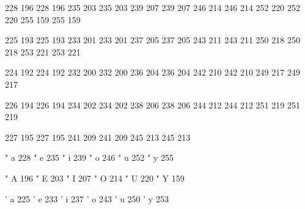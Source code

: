 

\startmapping[texnansi] 

 228 196  228 196  
 235 203  235 203
 239 207  239 207
 246 214  246 214
 252 220  252 220
 255 159  255 159

 225 193  225 193
 233 201  233 201
 237 205  237 205
 243 211  243 211
 250 218  250 218
 253 221  253 221

 224 192  224 192
 232 200  232 200
 236 204  236 204
 242 210  242 210
 249 217  249 217

 226 194  226 194
 234 202  234 202
 238 206  238 206
 244 212  244 212
 251 219  251 219

 227 195  227 195
 241 209  241 209
 245 213  245 213

\stopmapping

\startencoding[texnansi]

 " a 228      
 " e 235      
 " i 239
 " o 246
 " u 252
 " y 255

 " A 196      
 " E 203
 " I 207
 " O 214
 " U 220
 " Y 159

 ' a 225
 ' e 233
 ' i 237
 ' o 243
 ' u 250
 ' y 253


